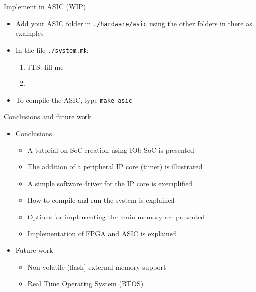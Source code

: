 \documentclass [xcolor=svgnames, t] {beamer}
\begin{document}
\begin{frame}{Implement in ASIC (WIP)}
\begin{itemize}
  \item Add your ASIC folder in {\tt ./hardware/asic} using the other folders in there as examples
  \item In the file {\tt ./system.mk}:
  \begin{enumerate}
    \item JTS: fill me
    \item 
  \end{enumerate}
  \item To compile the ASIC, type {\tt make asic}
\end{itemize}
\end{frame}


\begin{frame}{Conclusions and future work}

\begin{itemize}
  \item Conclusions
    \begin{itemize}
    \item A tutorial on SoC creation using IOb-SoC is presented
    \item The addition of a peripheral IP core (timer) is illustrated
    \item A simple software driver for the IP core is exemplified
    \item How to compile and run the system is explained 
    \item Options for implementing the main memory are presented
    \item Implementation of FPGA and ASIC is explained
    \end{itemize}
  \item Future work
    \begin{itemize}
    \item Non-volatile (flash) external memory support
    \item Real Time Operating System (RTOS) 
    \end{itemize}
\end{itemize}

\end{frame}

\end{document}
